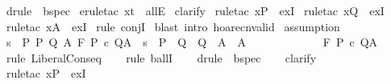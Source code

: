 \begin{isabellebody}
\isamarkupfalse%
\ {\isacharparenleft}drule\ {\isacharparenleft}{}{\isacharparenright}\ bspec{\isacharparenright}\isanewline
{}\isamarkupfalse%
\ {\isacharparenleft}erule{\isacharunderscore}tac\ x{\isacharequal}t\ \ allE{\isacharparenright}\isanewline
{}\isamarkupfalse%
\ clarify\isanewline
{}\isamarkupfalse%
\ {\isacharparenleft}rule{\isacharunderscore}tac\ x{\isacharequal}P{\isacharprime}\ \ exI{\isacharparenright}\isanewline
{}\isamarkupfalse%
\ {\isacharparenleft}rule{\isacharunderscore}tac\ x{\isacharequal}Q{\isacharprime}\ \ exI{\isacharparenright}\isanewline
{}\isamarkupfalse%
\ {\isacharparenleft}rule{\isacharunderscore}tac\ x{\isacharequal}A{\isacharprime}\ \ exI{\isacharparenright}\isanewline
{}\isamarkupfalse%
\ {\isacharparenleft}rule\ conjI{\isacharparenright}\isanewline
{}\isamarkupfalse%
\ {\isacharparenleft}blast\ intro{\isacharcolon}\ hoare{\isacharunderscore}cnvalid{\isacharparenright}\isanewline
{}\isamarkupfalse%
\ assumption\isanewline
{}\isamarkupfalse%
%
\endisatagproof
{\isafoldproof}%
%
\isadelimproof
\isanewline
%
\endisadelimproof
\isanewline
{}\isamarkupfalse%
\ {\isachardoublequoteopen}{\isasymforall}s\ {\isasymin}\ P{\isachardot}\ {\isasymexists}P{\isacharprime}\ Q{\isacharprime}\ A{\isacharprime}{\isachardot}\ {\isasymGamma}{\isacharcomma}{\isasymTheta}{\isasymturnstile}\isactrlbsub {\isacharslash}F\isactrlesub \ P{\isacharprime}\ c\ Q{\isacharprime}{\isacharcomma}A{\isacharprime}\ {\isasymand}\ s\ {\isasymin}\ P{\isacharprime}\ {\isasymand}\ Q{\isacharprime}\ {\isasymsubseteq}\ Q\ {\isasymand}\ A{\isacharprime}\ {\isasymsubseteq}\ A\ \isanewline
\ \ \ \ \ \ \ \ \ \ \ {\isasymLongrightarrow}\ {\isasymGamma}{\isacharcomma}{\isasymTheta}{\isasymturnstile}\isactrlbsub {\isacharslash}F\isactrlesub \ P\ c\ Q{\isacharcomma}A{\isachardoublequoteclose}\isanewline
%
\isadelimproof
\ \ %
\endisadelimproof
%
\isatagproof
{}\isamarkupfalse%
\ {\isacharparenleft}rule\ LiberalConseq{\isacharparenright}\isanewline
\ \ \isamarkupfalse%
\ {\isacharparenleft}rule\ ballI{\isacharparenright}\isanewline
\ \ \isamarkupfalse%
\ {\isacharparenleft}drule\ {\isacharparenleft}{}{\isacharparenright}\ bspec{\isacharparenright}\isanewline
\ \ \isamarkupfalse%
\ clarify\isanewline
\ \ \isamarkupfalse%
\ {\isacharparenleft}rule{\isacharunderscore}tac\ x{\isacharequal}P{\isacharprime}\ \ exI{\isacharparenright}\isanewline

\end{isabellebody}
